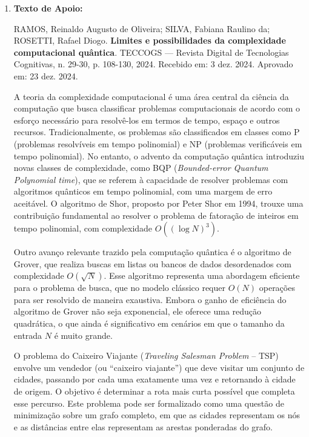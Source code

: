 \documentclass[12pt,a4paper]{article}
\begin{document}
\begin{enumerate}
assinale a alternativa que indica corretamente a quantidade total de cabos de rede (arestas) utilizados nessa topologia:
\begin{enumerate}[label=\alph*)]
    \item 15 cabos.
    \item 30 cabos.
    \item 60 cabos.
    \item 120 cabos.
\end{enumerate}
\item \textbf{Texto de Apoio:}
\vspace{0.3cm}

    RAMOS, Reinaldo Augusto de Oliveira; SILVA, Fabiana Raulino da; ROSETTI, Rafael Diogo. \textbf{Limites e possibilidades da complexidade computacional quântica}. TECCOGS — Revista Digital de Tecnologias Cognitivas, n. 29-30, p. 108-130, 2024. Recebido em: 3 dez. 2024. Aprovado em: 23 dez. 2024.
\vspace{0.3cm}

    A teoria da complexidade computacional é uma área central da ciência da computação que busca classificar problemas computacionais de acordo com o esforço necessário para resolvê-los em termos de tempo, espaço e outros recursos. Tradicionalmente, os problemas são classificados em classes como P (problemas resolvíveis em tempo polinomial) e NP (problemas verificáveis em tempo polinomial). No entanto, o advento da computação quântica introduziu novas classes de complexidade, como BQP (\textit{Bounded-error Quantum Polynomial time}), que se referem à capacidade de resolver problemas com algoritmos quânticos em tempo polinomial, com uma margem de erro aceitável. O algoritmo de Shor, proposto por Peter Shor em 1994, trouxe uma contribuição fundamental ao resolver o problema de fatoração de inteiros em tempo polinomial, com complexidade $O((\log N)^3)$.

Outro avanço relevante trazido pela computação quântica é o algoritmo de Grover, que realiza buscas em listas ou bancos de dados desordenados com complexidade $O(\sqrt{N})$. Esse algoritmo representa uma abordagem eficiente para o problema de busca, que no modelo clássico requer $O(N)$ operações para ser resolvido de maneira exaustiva. Embora o ganho de eficiência do algoritmo de Grover não seja exponencial, ele oferece uma redução quadrática, o que ainda é significativo em cenários em que o tamanho da entrada $N$ é muito grande. 

O problema do Caixeiro Viajante (\textit{Traveling Salesman Problem} – TSP) envolve um vendedor (ou ``caixeiro viajante'') que deve visitar um conjunto de cidades, passando por cada uma exatamente uma vez e retornando à cidade de origem. O objetivo é determinar a rota mais curta possível que completa esse percurso. Este problema pode ser formalizado como uma questão de minimização sobre um grafo completo, em que as cidades representam os nós e as distâncias entre elas representam as arestas ponderadas do grafo.


\end{enumerate}
\end{document}
